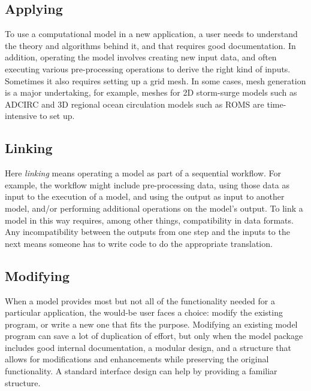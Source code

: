 \documentclass[journal abbreviation, manuscript]{copernicus}
\begin{document}
\subsection{Applying}

To use a computational model in a new application, a user needs to understand the theory and algorithms behind it, and that requires good documentation. In addition, operating the model involves creating new input data, and often executing various pre-processing operations to derive the right kind of inputs. Sometimes it also requires setting up a grid mesh. In some cases, mesh generation is a major undertaking, for example, meshes for 2D storm-surge models such as ADCIRC \citep{luettich1992adcirc} and 3D regional ocean circulation models such as ROMS \citep{shchepetkin2005regional} are time-intensive to set up.


\subsection{Linking}

Here \textit{linking} means operating a model as part of a sequential workflow. For example, the workflow might include pre-processing data, using those data as input to the execution of a model, and using the output as input to another model, and/or performing additional operations on the model's output. To link a model in this way requires, among other things, compatibility in data formats. Any incompatibility between the outputs from one step and the inputs to the next means someone has to write code to do the appropriate translation.

\subsection{Modifying}

When a model provides most but not all of the functionality needed for a particular application, the would-be user faces a choice: modify the existing program, or write a new one that fits the purpose. Modifying an existing model program can save a lot of duplication of effort, but only when the model package includes good internal documentation, a modular design, and a structure that allows for modifications and enhancements while preserving the original functionality. A standard interface design can help by providing a familiar structure.
\end{document}
